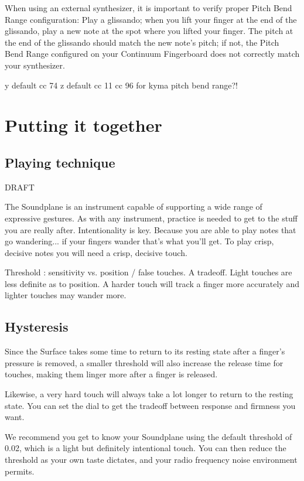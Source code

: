 When using an external synthesizer, it is important to verify proper Pitch Bend Range configuration: Play a glissando; when you lift your finger at the end of the glissando, play a new note at the spot where you lifted your finger. The pitch at the end of the glissando should match the new note’s pitch; if not, the Pitch Bend Range configured on your Continuum Fingerboard does not correctly match your synthesizer.

y default cc 74
z default cc 11
cc 96 for kyma pitch bend range?!


\chapter{Putting it together}


\section{Playing technique}

DRAFT 

The Soundplane is an instrument capable of supporting a wide range of expressive gestures.  As with any instrument, practice is needed to get to the stuff you are really after.  Intentionality is key.  Because you are able to play notes that go wandering... if your fingers wander that’s what you’ll get.  To play crisp, decisive notes you will need a crisp, decisive touch.


Threshold : sensitivity vs. position / false touches.  A tradeoff.  Light touches are less definite as to position. A harder touch will track a finger more accurately and lighter touches may wander more.



\section{Hysteresis}

Since the Surface takes some time to return to its resting state after a finger’s pressure is removed, a smaller threshold will also increase the release time for touches, making them linger more after a finger is released. 

Likewise, a very hard touch will always take a lot longer to return to the resting state.  You can set the   dial to get the tradeoff between response and firmness you want. 

We recommend you get to know your Soundplane using the default threshold of 0.02, which is a light but definitely intentional touch.  You can then reduce the threshold as your own taste dictates, and your radio frequency noise environment permits.  

